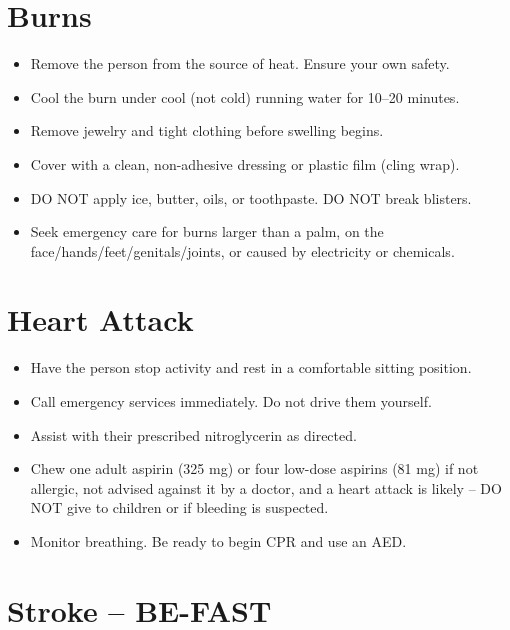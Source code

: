 \section{Burns}

\begin{itemize}[leftmargin=*]
\item Remove the person from the source of heat. Ensure your own safety.
\item Cool the burn under cool (not cold) running water for 10--20 minutes.
\item Remove jewelry and tight clothing before swelling begins.
\item Cover with a clean, non-adhesive dressing or plastic film (cling wrap).
\item DO NOT apply ice, butter, oils, or toothpaste. DO NOT break blisters.
\item Seek emergency care for burns larger than a palm, on the face/hands/feet/genitals/joints, or caused by electricity or chemicals.
\end{itemize}

\section{Heart Attack}

\begin{itemize}[leftmargin=*]
\item Have the person stop activity and rest in a comfortable sitting position.
\item Call emergency services immediately. Do not drive them yourself.
\item Assist with their prescribed nitroglycerin as directed.
\item Chew one adult aspirin (325 mg) or four low-dose aspirins (81 mg) if not allergic, not advised against it by a doctor, and a heart attack is likely -- DO NOT give to children or if bleeding is suspected.
\item Monitor breathing. Be ready to begin CPR and use an AED.
\end{itemize}

\section{Stroke -- BE-FAST}

